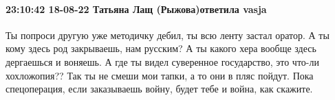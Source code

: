  
 
 
 
 

\paragraph{23:10:42 18-08-22 Татьяна Лащ (Рыжова)ответила vasja}

Ты попроси другую уже методичку дебил, ты всю ленту застал оратор. А ты кому
здесь род закрываешь, нам русским? А ты какого хера вообще здесь дергаешься и
воняешь. А где ты видел суверенное государство, это что-ли хохложопия?? Так ты
не смеши мои тапки, а то они в пляс пойдут. Пока спецоперация, если заказываешь
войну, будет тебе и война, как скажите.
